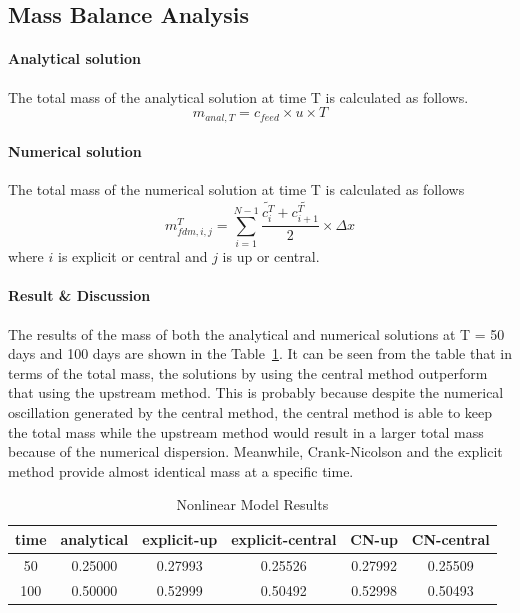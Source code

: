 \subsection{Mass Balance Analysis}
\paragraph{Analytical solution} The total mass of the analytical solution at time T is calculated as follows.
\begin{equation}
  m_{anal,T}=c_{feed}\times u \times T
\end{equation}

\paragraph{Numerical solution} The total mass of the numerical solution at time T is calculated as follows
\begin{equation}
  m_{fdm,i,j}^T = \sum\limits_{i=1}^{N-1} \frac{\tilde{c_i^T} + \tilde{c_{i+1}^T}}{2}\times \Delta x
\end{equation}
where $i$ is explicit or central and $j$ is up or central.

\paragraph{Result \& Discussion} The results of the mass of both the analytical and numerical solutions at T = 50 days and 100 days are shown in the Table~\ref{table:mass}. It can be seen from the table that in terms of the total mass, the solutions by using the central method outperform that using the upstream method. This is probably because despite the numerical oscillation generated by the central method, the central method is able to keep the total mass while the upstream method would result in a larger total mass because of the numerical dispersion. Meanwhile, Crank-Nicolson and the explicit method provide almost identical mass at a specific time.
\begin{table}[ht]
\caption{Nonlinear Model Results}
\centering
\begin{tabular}{c c c c c c}
\hline\hline 
time & analytical & explicit-up & explicit-central & CN-up & CN-central \\ [0.5ex]
\hline
50 &  0.25000 & 0.27993 & 0.25526 & 0.27992 & 0.25509 \\ 
100 & 0.50000 & 0.52999 & 0.50492 & 0.52998 & 0.50493 \\ [1ex]
\hline
\end{tabular}
\label{table:mass}
\end{table}
